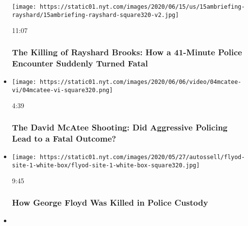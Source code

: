 \begin{itemize}
  \texttt{[image: https://static01.nyt.com/images/2020/06/15/us/15ambriefing-rayshard/15ambriefing-rayshard-square320-v2.jpg]}

  11:07

  \hypertarget{the-killing-of-rayshard-brooks-how-a-41-minute-police-encounter-suddenly-turned-fatal}{%
  \subsubsection{The Killing of Rayshard Brooks: How a 41-Minute Police
  Encounter Suddenly Turned
  Fatal}\label{the-killing-of-rayshard-brooks-how-a-41-minute-police-encounter-suddenly-turned-fatal}}
\item
  \href{https://www.nytimes.com/video/us/100000007175316/the-david-mcatee-shooting-did-aggressive-policing-lead-to-a-fatal-outcome.html?action=click\&module=video-series-bar\&region=header\&pgtype=Article\&playlistId=video/investigations}{}

  \texttt{[image: https://static01.nyt.com/images/2020/06/06/video/04mcatee-vi/04mcatee-vi-square320.png]}

  4:39

  \hypertarget{the-david-mcatee-shooting-did-aggressive-policing-lead-to-a-fatal-outcome}{%
  \subsubsection{The David McAtee Shooting: Did Aggressive Policing Lead
  to a Fatal
  Outcome?}\label{the-david-mcatee-shooting-did-aggressive-policing-lead-to-a-fatal-outcome}}
\item
  \href{https://www.nytimes.com/video/us/100000007159353/george-floyd-arrest-death-video.html?action=click\&module=video-series-bar\&region=header\&pgtype=Article\&playlistId=video/investigations}{}

  \texttt{[image: https://static01.nyt.com/images/2020/05/27/autossell/flyod-site-1-white-box/flyod-site-1-white-box-square320.jpg]}

  9:45

  \hypertarget{how-george-floyd-was-killed-in-police-custody}{%
  \subsubsection{How George Floyd Was Killed in Police
  Custody}\label{how-george-floyd-was-killed-in-police-custody}}
\item
  \href{https://www.nytimes.com/video/us/100000007142853/ahmaud-arbery-video-911-georgia.html?action=click\&module=video-series-bar\&region=header\&pgtype=Article\&playlistId=video/investigations}{}


\end{itemize}
